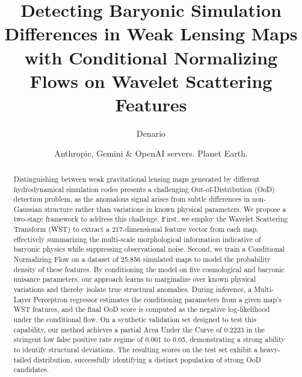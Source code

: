 \documentclass[]{article}
\begin{document}
\title{Detecting Baryonic Simulation Differences in Weak Lensing Maps with Conditional Normalizing Flows on Wavelet Scattering Features}

\author{Denario}
\date{Anthropic, Gemini \& OpenAI servers. Planet Earth.}

\maketitle
\begin{abstract}
Distinguishing between weak gravitational lensing maps generated by different hydrodynamical simulation codes presents a challenging Out-of-Distribution (OoD) detection problem, as the anomalous signal arises from subtle differences in non-Gaussian structure rather than variations in known physical parameters. We propose a two-stage framework to address this challenge. First, we employ the Wavelet Scattering Transform (WST) to extract a 217-dimensional feature vector from each map, effectively summarizing the multi-scale morphological information indicative of baryonic physics while suppressing observational noise. Second, we train a Conditional Normalizing Flow on a dataset of 25,856 simulated maps to model the probability density of these features. By conditioning the model on five cosmological and baryonic nuisance parameters, our approach learns to marginalize over known physical variations and thereby isolate true structural anomalies. During inference, a Multi-Layer Perceptron regressor estimates the conditioning parameters from a given map's WST features, and the final OoD score is computed as the negative log-likelihood under the conditional flow. On a synthetic validation set designed to test this capability, our method achieves a partial Area Under the Curve of 0.2223 in the stringent low false positive rate regime of 0.001 to 0.05, demonstrating a strong ability to identify structural deviations. The resulting scores on the test set exhibit a heavy-tailed distribution, successfully identifying a distinct population of strong OoD candidates.
\end{abstract}
\end{document}
